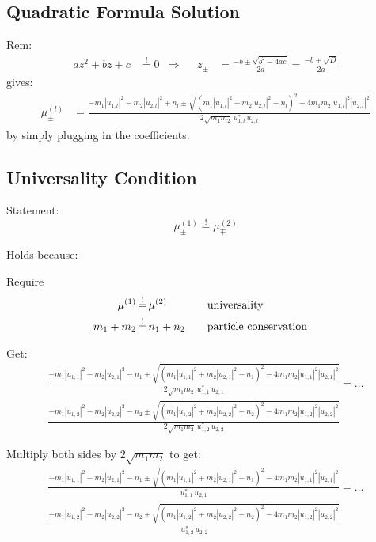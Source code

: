 \documentclass[
	english,
	a4paper,
	fontsize=10pt,
	parskip=half,
	titlepage=true,
	DIV=12,
	final
]{scrreprt}
\newcommand*{\Thus}{\ensuremath{\Rightarrow}\xspace}
\newcommand*{\equalCond}{  \mathop{=}\limits^!  }
\begin{document}
\subsection{Quadratic Formula Solution}
Rem:
\begin{align}
	a z^{2} + b z + c 
&\equalCond 
	0
&\Thus&&
	z_{\pm} 
&= 
	\frac
		{-b \pm \sqrt{b^{2} - 4ac}}
		{2a}
=
	\frac
		{-b \pm \sqrt{D}}
		{2a}
\end{align}
gives:
\begin{align}
	\mu_{\pm}^{(l)}
&=
	\frac
	{
		- m_1 |u_{1,l}|^{2}  -  m_2 |u_{2,l}|^{2} + n_l
		\pm
		\sqrt{
			(m_1 |u_{1,l}|^{2}  +  m_2 |u_{2,l}|^{2} - n_l)^{2}
			-
			4 m_1 m_2 |u_{1,l}|^{2} |u_{2,l}|^{2}
		}
	}
	{ 2\sqrt{m_1 m_2} \, u_{1,l}^{*} \, u_{2,l} }
\label{eqn:muQuadraticProto}
\end{align}
by simply plugging in the coefficients.

\subsection{Universality Condition}
Statement:
\begin{equation}
	\mu_{\pm}^{(1)} \equalCond \mu_{\mp}^{(2)}
\end{equation}

Holds because:

Require
\begin{align}
	\mu^{(1)} &\equalCond \mu^{(2)}		&& \qq{universality} \\
	m_1 + m_2 &\equalCond n_1 + n_2		&& \qq{particle conservation}
\end{align}

Get:
\begin{multline}
	\frac
	{
		- m_1 |u_{1,1}|^{2}  -  m_2 |u_{2,1}|^{2} - n_1
		\pm
		\sqrt{
			(m_1 |u_{1,1}|^{2}  +  m_2 |u_{2,1}|^{2} - n_1)^{2}
			-
			4 m_1 m_2 |u_{1,1}|^{2} |u_{2,1}|^{2}
		}
	}
	{ 2\sqrt{m_1 m_2} \, u_{1,1}^{*} \, u_{2,1} }
= \ldots \\
	\frac
	{
		- m_1 |u_{1,2}|^{2}  -  m_2 |u_{2,2}|^{2} - n_2
		\pm
		\sqrt{
			(m_1 |u_{1,2}|^{2}  +  m_2 |u_{2,2}|^{2} - n_2)^{2}
			-
			4 m_1 m_2 |u_{1,2}|^{2} |u_{2,2}|^{2}
		}
	}
	{ 2\sqrt{m_1 m_2} \, u_{1,2}^{*} \, u_{2,2} }
\end{multline}

Multiply both sides by $2\sqrt{m_1 m_2}$ to get:
\begin{multline}
	\frac
	{
		- m_1 |u_{1,1}|^{2}  -  m_2 |u_{2,1}|^{2} - n_1
		\pm
		\sqrt{
			(m_1 |u_{1,1}|^{2}  +  m_2 |u_{2,1}|^{2} - n_1)^{2}
			-
			4 m_1 m_2 |u_{1,1}|^{2} |u_{2,1}|^{2}
		}
	}
	{ u_{1,1}^{*} \, u_{2,1} }
= \ldots \\
	\frac
	{
		- m_1 |u_{1,2}|^{2}  -  m_2 |u_{2,2}|^{2} - n_2
		\pm
		\sqrt{
			(m_1 |u_{1,2}|^{2}  +  m_2 |u_{2,2}|^{2} - n_2)^{2}
			-
			4 m_1 m_2 |u_{1,2}|^{2} |u_{2,2}|^{2}
		}
	}
	{ \, u_{1,2}^{*} \, u_{2,2} }
\end{multline}
\end{document}
